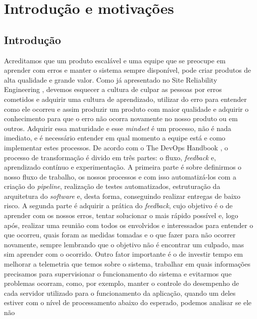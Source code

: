 \chapter{Introdução e motivações}
  \section{Introdução}
    Acreditamos que um produto escalável e uma equipe que se preocupe em aprender
    com erros e manter o sistema sempre disponível, pode criar produtos de alta
    qualidade e grande valor. Como já apresentado no Site Reliability Engineering
    \cite{SiteReliabilityEngineering}, devemos esquecer a cultura de culpar as
    pessoas por erros cometidos e adquirir uma cultura de aprendizado, utilizar
    do erro para entender como ele ocorreu e assim produzir um produto com maior
    qualidade e adquirir o conhecimento para que o erro não ocorra novamente no
    nosso produto ou em outros. Adquirir essa maturidade e esse \textit{mindset}
    é um processo, não é nada imediato, e é necessário entender em qual momento
    a equipe está e como implementar estes processos. \newline
    De acordo com o The DevOps Handbook \cite{TheDevOpsHandbook}, o processo de
    transformação é divido em três partes: o fluxo, \textit{feedback} e, aprendizado
    contínuo e experimentação. A primeira parte é sobre definirmos o nosso fluxo
    de trabalho, os nossos processos e com isso automatizá-los com a criação do
    \textit{pipeline}, realização de testes automatizados, estruturação da arquitetura
    do \textit{software} e, desta forma, conseguindo realizar entregas de baixo
    risco. A segunda parte é adquirir a prática do \textit{feedback}, cujo objetivo
    é o de aprender com os nossos erros, tentar solucionar o mais rápido possível
    e, logo após, realizar uma reunião com todos os envolvidos e interessados para
    entender o que ocorreu, quais foram as medidas tomadas e o que fazer para não
    ocorrer novamente, sempre lembrando que o objetivo não é encontrar um culpado,
    mas sim aprender com o ocorrido. Outro fator importante é o de investir tempo
    em melhorar a telemetria que temos sobre o sistema, trabalhar em quais informações
    precisamos para supervisionar o funcionamento do sistema e evitarmos que
    problemas ocorram, como, por exemplo, manter o controle do desempenho de cada
    servidor utilizado para o funcionamento da aplicação, quando um deles estiver
    com o nível de processamento abaixo do esperado, podemos analisar se ele não

